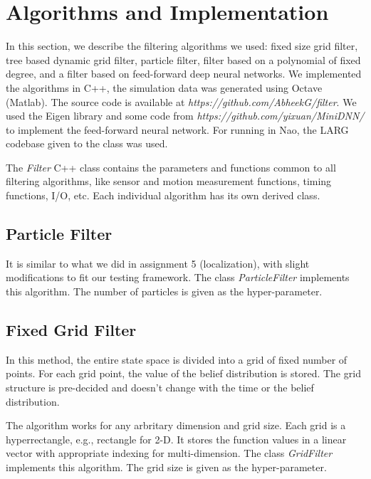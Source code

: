 \section{Algorithms and Implementation}
In this section, we describe the filtering algorithms we used: fixed size grid filter, tree based dynamic grid filter, particle filter, filter based on a polynomial of fixed degree, and a filter based on feed-forward deep neural networks. We implemented the algorithms in C++, the simulation data was generated using Octave (Matlab). The source code is available at \textit{https://github.com/AbheekG/filter}. We used the Eigen library and some code from \textit{https://github.com/yixuan/MiniDNN/} to implement the feed-forward neural network. For running in Nao, the LARG codebase given to the class was used.

The \textit{Filter} C++ class contains the parameters and functions common to all filtering algorithms, like sensor and motion measurement functions, timing functions, I/O, etc. Each individual algorithm has its own derived class.

\subsection{Particle Filter}
It is similar to what we did in assignment 5 (localization), with slight modifications to fit our testing framework. The class \textit{ParticleFilter} implements this algorithm. The number of particles is given as the hyper-parameter.

\subsection{Fixed Grid Filter}\label{gf_def}
In this method, the entire state space is divided into a grid of fixed number of points. For each grid point, the value of the belief distribution is stored. The grid structure is pre-decided and doesn't change with the time or the belief distribution.

The algorithm works for any arbritary dimension and grid size. Each grid is a hyperrectangle, e.g., rectangle for 2-D. It stores the function values in a linear vector with appropriate indexing for multi-dimension. The class \textit{GridFilter} implements this algorithm. The grid size is given as the hyper-parameter.

